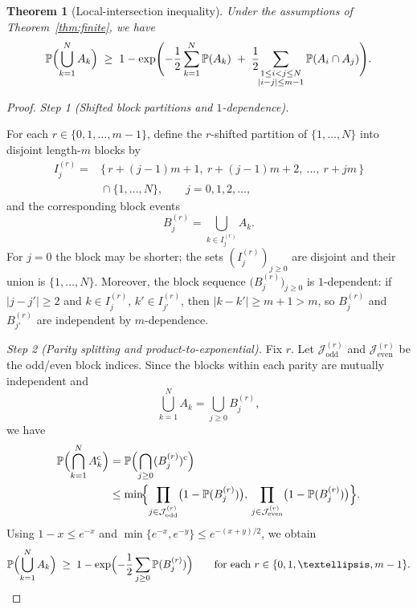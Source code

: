 \documentclass[10pt,a4paper]{amsart}
\newtheorem{theorem}{Theorem}
\begin{document}
\begin{theorem}[Local-intersection inequality]\label{thm:cov}
Under the assumptions of Theorem~\ref{thm:finite}, we have
\begin{equation}\label{eq:cov-refined}
  \mathbb{P}\Bigl(\bigcup_{k=1}^N A_k\Bigr)
  \;\ge\;
  1-\exp\Biggl(
   -\frac{1}{2}\sum_{k=1}^N \mathbb{P}(A_k)
   \;+\;\frac{1}{2}\!\!\sum_{\substack{1\le i<j\le N\\|i-j|\le m-1}}
   \mathbb{P}(A_i\cap A_j)
  \Biggr).
\end{equation}
\end{theorem}

\begin{proof}
\textit{Step 1 (Shifted block partitions and $1$-dependence).}\par
For each $r\in\{0,1,\dots,m-1\}$, define the $r$-shifted partition of
$\{1,\dots,N\}$ into disjoint length-$m$ blocks by
\[
\begin{aligned}
  I^{(r)}_{j}
  ={}&\{\,r+(j-1)m+1,\ r+(j-1)m+2,\ \dots,\ r+jm\,\}\\
      &{}\cap\{1,\dots,N\}, \qquad j=0,1,2,\dots,
\end{aligned}
\]
and the corresponding block events
\[
  B^{(r)}_{j}=\bigcup_{k\in I^{(r)}_{j}} A_k.
\]
For $j=0$ the block may be shorter; the sets $(I^{(r)}_{j})_{j\ge0}$ are
disjoint and their union is $\{1,\dots,N\}$.  Moreover, the block sequence
$\bigl(B^{(r)}_{j}\bigr)_{j\ge0}$ is $1$-dependent: if $|j-j'|\ge2$ and
$k\in I^{(r)}_{j}$, $k'\in I^{(r)}_{j'}$, then $|k-k'|\ge m+1>m$, so
$B^{(r)}_{j}$ and $B^{(r)}_{j'}$ are independent by $m$-dependence.

\medskip
\textit{Step 2 (Parity splitting and product-to-exponential).}
Fix $r$.  Let $\mathcal{J}_{\mathrm{odd}}^{(r)}$ and
$\mathcal{J}_{\mathrm{even}}^{(r)}$ be the odd/even block indices.  Since the
blocks within each parity are mutually independent and
\[
  \bigcup_{k=1}^N A_k = \bigcup_{j\ge0} B^{(r)}_{j},
\]
we have
\begin{align*}
\mathbb{P}\Bigl(\bigcap_{k=1}^N A_k^{\mathrm c}\Bigr)
  &= \mathbb{P}\Bigl(\bigcap_{j\ge0}(B^{(r)}_{j})^{\mathrm c}\Bigr)\\
  &\le \min\!\Bigl\{
  \prod_{j\in\mathcal{J}_{\mathrm{odd}}^{(r)}}\bigl(1-\mathbb{P}(B^{(r)}_{j})\bigr),\,
  \prod_{j\in\mathcal{J}_{\mathrm{even}}^{(r)}}\bigl(1-\mathbb{P}(B^{(r)}_{j})\bigr)
  \Bigr\}.
\end{align*}
Using $1-x\le e^{-x}$ and $\min\{e^{-x},e^{-y}\}\le e^{-(x+y)/2}$, we obtain
\begin{equation}\label{eq:parity-exp}
  \mathbb{P}\Bigl(\bigcup_{k=1}^N A_k\Bigr)
  \;\ge\; 1-\exp\Bigl(-\frac{1}{2}\sum_{j\ge0}\mathbb{P}(B^{(r)}_{j})\Bigr)
  \qquad\text{for each }r\in\{0,1,\dots,m-1\}.
\end{equation}


\end{proof}
\end{document}

